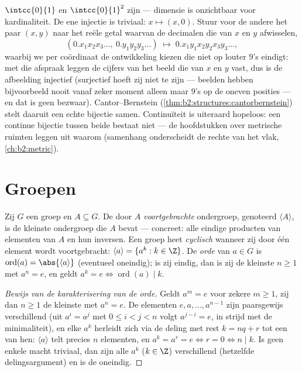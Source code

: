 \begin{example}\label{ex:b2:structures:squareseg}
$\intcc{0}{1}$ en $\intcc{0}{1}^2$ zijn  ---
dimensie is onzichtbaar voor kardinaliteit. De ene injectie is
triviaal: $x \mapsto (x, 0)$. Stuur voor de andere het paar $(x,
y)$ naar het reële getal waarvan de decimalen die van $x$ en $y$
afwisselen,
\[
(0.x_1x_2x_3\dots,\ 0.y_1y_2y_3\dots)
\;\longmapsto\; 0.x_1y_1x_2y_2x_3y_3\dots,
\]
waarbij we per coördinaat de ontwikkeling kiezen die niet op
louter $9$'s eindigt: met die afspraak leggen de cijfers van het
beeld die van $x$ en $y$ vast, dus is de afbeelding injectief
(surjectief hoeft zij niet te zijn --- beelden hebben bijvoorbeeld
nooit vanaf zeker moment alleen maar $9$'s op de oneven posities
--- en dat is geen bezwaar). Cantor--Bernstein
(\cref{thm:b2:structures:cantorbernstein}) stelt daaruit een
echte bijectie samen. Continuïteit is uiteraard hopeloos: een
continue bijectie tussen beide bestaat niet --- de hoofdstukken
over metrische ruimten leggen uit waarom (samenhang onderscheidt
de rechte van het vlak, \cref{ch:b2:metric}).
\end{example}

\section{Groepen}

\begin{definition}\label{def:b2:structures:generated}
Zij $G$ een groep en $A \subseteq G$. De door $A$
\emph{voortgebrachte} ondergroep, genoteerd $\langle A \rangle$,
is de kleinste ondergroep die $A$ bevat --- concreet: alle
eindige producten van elementen van $A$ en hun inversen. Een groep
heet \emph{cyclisch} wanneer zij door één
element wordt voortgebracht: $\langle a\rangle = \{a^k : k \in
\Z\}$. De \emph{orde} van $a \in G$ is
$\operatorname{ord}(a) = \abs{\langle a \rangle}$ (eventueel
oneindig); is zij eindig, dan is zij de kleinste $n \geq 1$ met
$a^n = e$, en geldt $a^k = e \iff \operatorname{ord}(a) \mid k$.
\end{definition}

\begin{proof}[Bewijs van de karakterisering van de orde]
Geldt $a^m = e$ voor zekere $m \geq 1$, zij dan $n \geq 1$ de
kleinste met $a^n = e$. De elementen $e, a, \dots, a^{n-1}$ zijn
paarsgewijs verschillend (uit $a^{i} = a^{j}$ met $0 \leq i < j <
n$ volgt $a^{j-i} = e$, in strijd met de minimaliteit), en elke
$a^k$ herleidt zich via de deling met rest $k = nq + r$ tot een
van hen: $\langle a\rangle$ telt precies $n$ elementen, en $a^k =
a^r = e \iff r = 0 \iff n \mid k$. Is geen enkele macht triviaal,
dan zijn alle $a^k$ ($k \in \Z$) verschillend (hetzelfde
delingsargument) en is de  oneindig.
\end{proof}

